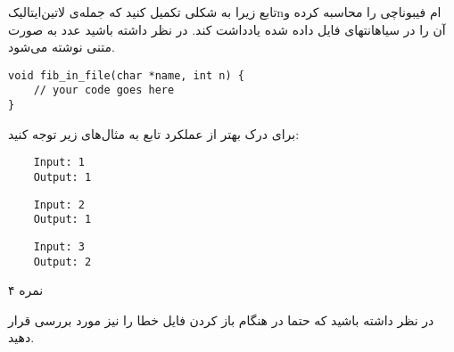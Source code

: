 
تابع زیرا به شکلی تکمیل کنید
که جمله‌ی ‌لاتین{‌ایتالیک{n}}ام فیبوناچی را محاسبه کرده
و آن را در ‌سیاه{انتهای} فایل داده شده یادداشت کند.
در نظر داشته باشید عدد به صورت متنی نوشته می‌شود.

\begin{latin}
\begin{verbatim}
void fib_in_file(char *name, int n) {
    // your code goes here
}
\end{verbatim}
\end{latin}

برای درک بهتر از عملکرد تابع به مثال‌های زیر توجه کنید:

\begin{latin}
\begin{verbatim}
    Input: 1
    Output: 1
\end{verbatim}

\begin{verbatim}
    Input: 2
    Output: 1
\end{verbatim}

\begin{verbatim}
    Input: 3
    Output: 2
\end{verbatim}
\end{latin}

۴ نمره

در نظر داشته باشید که حتما در هنگام باز کردن فایل خطا را نیز مورد بررسی قرار دهید.
